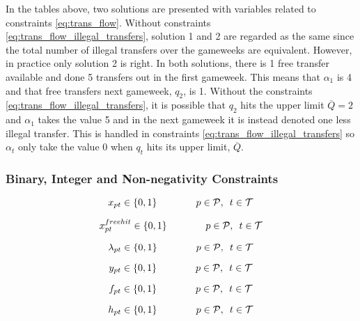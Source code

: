 In the tables above, two solutions are presented with variables related to constraints \eqref{eq:trans_flow}. Without constraints \eqref{eq:trans_flow_illegal_transfers}, solution 1 and 2 are regarded as the same since the total number of illegal transfers over the gameweeks are equivalent. However, in practice only solution 2 is right. In both solutions, there is 1 free transfer available and done 5 transfers out in the first gameweek. This means that $\alpha_{1}$ is 4 and that free transfers next gameweek, $q_{2}$, is 1. Without the constraints \eqref{eq:trans_flow_illegal_transfers}, it is possible that $q_{2}$ hits the upper limit $\overline{Q} = 2$ and $\alpha_{1}$ takes the value 5 and in the next gameweek it is instead denoted one less illegal transfer. This is handled in constraints \eqref{eq:trans_flow_illegal_transfers} so $\alpha_{t}$ only take the value 0 when $q_{t}$ hits its upper limit, $\overline{Q}$. 

\subsubsection{Binary, Integer and Non-negativity Constraints}

\begin{equation} \label{eq:bin_x}
    x_{pt} \in \{0,1\} \qquad\qquad p \in \mathcal{P}, \enskip t \in \mathcal{T}
\end{equation}

\begin{equation} \label{eq:free_hit_bin_x}
    x^{free hit}_{pt} \in \{0,1\} \qquad\qquad p \in \mathcal{P}, \enskip t \in \mathcal{T}
\end{equation}

\begin{equation} \label{eq:auxiliary_variable_binary}
    \lambda_{pt} \in \{0,1\} \qquad\qquad p \in \mathcal{P}, \enskip t \in \mathcal{T}
\end{equation}

\begin{equation} \label{eq:bin_y}
    y_{pt} \in \{0,1\} \qquad\qquad p \in \mathcal{P}, \enskip t \in \mathcal{T}
\end{equation}

\begin{equation} \label{eq:bin_f}
    f_{pt} \in \{0,1\} \qquad\qquad p \in \mathcal{P}, \enskip t \in \mathcal{T}
\end{equation}

\begin{equation} \label{eq:bin_h}
    h_{pt} \in \{0,1\} \qquad\qquad p \in \mathcal{P}, \enskip t \in \mathcal{T}
\end{equation}
 
